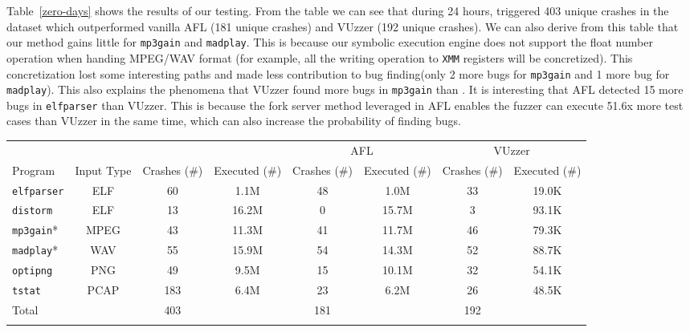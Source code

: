 Table~\ref{zero-days} shows the results of our testing. 
From the table we can see that during 24 hours, \prototype triggered 403 
unique crashes in the dataset which outperformed vanilla AFL (181 unique crashes) 
and VUzzer (192 unique crashes). 
We can also derive from this table that our method gains little for \texttt{mp3gain} 
and \texttt{madplay}. This is because our symbolic execution engine does not support 
the float number operation when handing MPEG/WAV format (for example, all the 
writing operation to \texttt{XMM} registers will be concretized). This concretization 
lost some interesting paths and made less contribution to bug finding(only 2 more 
bugs for \texttt{mp3gain} and 1 more bug for \texttt{madplay}). 
This also explains the phenomena that VUzzer found more bugs in \texttt{mp3gain} 
than \prototype. 
It is interesting that AFL detected 15 more bugs in \texttt{elfparser} than VUzzer. 
This is because the fork server method leveraged in AFL enables the fuzzer can 
execute 51.6x more test cases than VUzzer in the same time, which can also increase 
the probability of finding bugs.

\begin{table}[!t]
{\begin{tabular}{lccccccc}\toprule
	& & \multicolumn{2}{c}{\prototype} & \multicolumn{2}{c}{AFL} & \multicolumn{2}{c}{VUzzer}\\
		    Program & Input Type & Crashes (\#) & Executed (\#)& 
		    Crashes (\#) & Executed  (\#) & Crashes (\#) & Executed (\#) \\
\midrule
\texttt{elfparser}  & ELF	& 60 &   1.1M & 48   & 1.0M   & 33 & 19.0K    \\
		\texttt{distorm}    & ELF    & 13 &   16.2M   & 0   & 15.7M    & 3 & 93.1K    \\
		\texttt{mp3gain}*   & MPEG	& 43 &   11.3M  & 41  &  11.7M   & 46 &  79.3K  \\
		\texttt{madplay}*   & WAV	& 55 &   15.9M  & 54  & 14.3M    & 52 & 88.7K   \\
		\texttt{optipng}    & PNG    & 49 &   9.5M & 15  &  10.1M   & 32 & 54.1K   \\
		\texttt{tstat}      & PCAP   & 183&   6.4M & 23 &  6.2M   & 26 & 48.5K   \\
		\midrule
		Total      &        & 403   &  & 181 &  & 192 &\\
\botrule
\end{tabular}}{}
\end{table}

